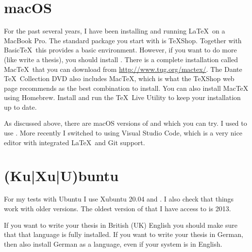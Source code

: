 \section{macOS}%
\label{sec:app:mac}

For the past several years,
I have been installing and running \LaTeX\ on a MacBook Pro.
The standard package you start with is \TeX Shop. 
Together with Basic\TeX\ this provides a basic environment. 
However, if you want to do more (like write a thesis), you should install \TeXLive.
There is a complete \TeXLive installation called Mac\TeX\ 
that you can download from \url{http://www.tug.org/mactex/}.
The Dante \TeX\ Collection DVD also includes Mac\TeX, which is what the \TeX Shop web page
recommends as the best combination to install.
You can also install Mac\TeX{} using Homebrew.
Install and run the \TeX\ Live Utility to keep your installation up to date.

As discussed above, there are macOS versions of \TeXstudio and \TeXmaker which you can try.
I used to use \TeXstudio.
More recently I switched to using Visual Studio Code,
which is a very nice editor with integrated \LaTeX\ and Git support.

\section{(Ku|Xu|U)buntu}%
\label{sec:app:kubuntu}

For my tests with Ubuntu I use Xubuntu 20.04 and .
I also check that things work with older versions.
The oldest version of \TeXLive that I have access to is 2013.

If you want to write your thesis in British (UK) English you should make sure
that that language is fully installed. If you want to write your
thesis in German, then also install German as a language, even if
your system is in English.

